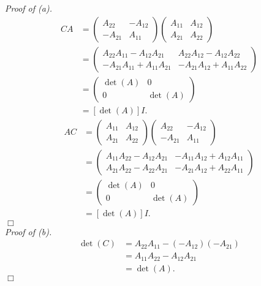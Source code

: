 \documentclass{article}
\begin{document}
\emph{Proof of (a).}
\begin{align*}
  CA
  &=
    \begin{pmatrix}
    A_{22} & -A_{12} \\
    -A_{21} & A_{11}
    \end{pmatrix}
    \begin{pmatrix}
    A_{11} & A_{12} \\
    A_{21} & A_{22}
    \end{pmatrix} \\
  &=
    \begin{pmatrix}
    A_{22}A_{11}-A_{12}A_{21}& A_{22}A_{12}-A_{12}A_{22} \\
    -A_{21}A_{11}+A_{11}A_{21} & -A_{21}A_{12}+A_{11}A_{22}
    \end{pmatrix} \\
  &=
    \begin{pmatrix}
    \det(A) & 0 \\
    0 & \det(A)
    \end{pmatrix} \\
  &= [\det(A)]I.
\end{align*}
\begin{align*}
  AC
  &=
    \begin{pmatrix}
    A_{11} & A_{12} \\
    A_{21} & A_{22}
    \end{pmatrix}
    \begin{pmatrix}
    A_{22} & -A_{12} \\
    -A_{21} & A_{11}
    \end{pmatrix} \\
  &=
    \begin{pmatrix}
    A_{11}A_{22}-A_{12}A_{21}& -A_{11}A_{12}+A_{12}A_{11} \\
    A_{21}A_{22}-A_{22}A_{21} & -A_{21}A_{12}+A_{22}A_{11}
    \end{pmatrix} \\
  &=
    \begin{pmatrix}
    \det(A) & 0 \\
    0 & \det(A)
    \end{pmatrix} \\
  &= [\det(A)]I.
\end{align*}
$\Box$ \\

\emph{Proof of (b).}
\begin{align*}
\det(C)
&= A_{22}A_{11} - (-A_{12})(-A_{21}) \\
&= A_{11}A_{22} - A_{12}A_{21} \\
&= \det(A).
\end{align*}
$\Box$ \\
\end{document}
